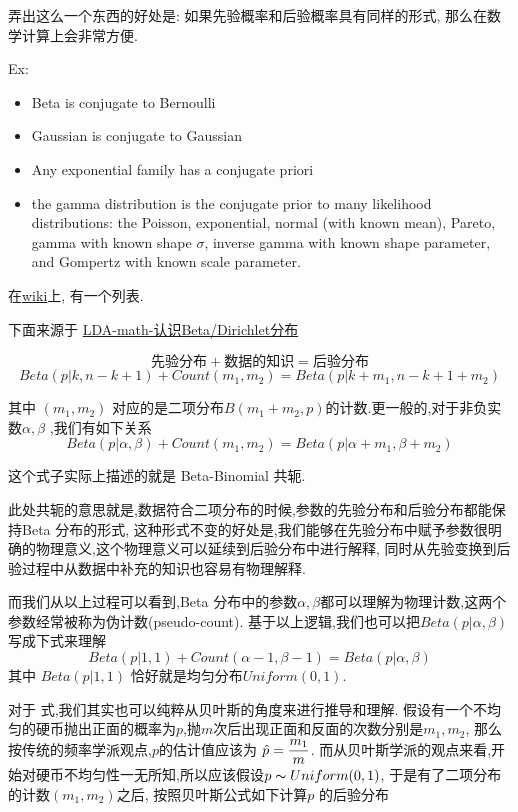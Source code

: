 \documentclass{article}
\begin{document}
弄出这么一个东西的好处是: 如果先验概率和后验概率具有同样的形式, 那么在数学计算上会非常方便.

Ex:
\begin{itemize}
\item Beta is conjugate to Bernoulli
\item Gaussian is conjugate to Gaussian
\item Any exponential family has a conjugate priori
\item the gamma distribution is the conjugate prior to many likelihood distributions: the Poisson, exponential, normal (with known mean), Pareto, gamma with known shape $\sigma$, inverse gamma with known shape parameter, and Gompertz with known scale parameter.
\end{itemize}

在\href{http://en.wikipedia.org/wiki/Conjugate\_prior\_distribution#Table\_of\_conjugate\_distributions}{wiki}上, 有一个列表.

下面来源于
\href{http://cos.name/2013/01/lda-math-beta-dirichlet/}{LDA-math-认识Beta/Dirichlet分布}

$$\text{先验分布} + \text{数据的知识} = \text{后验分布}$$
$$ Beta(p|k,n-k+1) + Count(m_1,m_2) = Beta(p|k+m_1,n-k+1+m_2) $$

其中 $(m_1,m_2)$ 对应的是二项分布$B(m_1+m_2,p)$的计数.更一般的,对于非负实数$\alpha,\beta$ ,我们有如下关系
$$ Beta(p|\alpha,\beta) + Count(m_1,m_2) = Beta(p|\alpha+m_1,\beta+m_2) $$

这个式子实际上描述的就是  Beta-Binomial 共轭.

此处共轭的意思就是,数据符合二项分布的时候,参数的先验分布和后验分布都能保持Beta 分布的形式,
这种形式不变的好处是,我们能够在先验分布中赋予参数很明确的物理意义,这个物理意义可以延续到后验分布中进行解释,
同时从先验变换到后验过程中从数据中补充的知识也容易有物理解释.

而我们从以上过程可以看到,Beta 分布中的参数$\alpha,\beta$都可以理解为物理计数,这两个参数经常被称为伪计数(pseudo-count).
基于以上逻辑,我们也可以把$Beta(p|\alpha,\beta)$写成下式来理解
\begin{equation}
Beta(p|1,1) + Count(\alpha-1,\beta-1) = Beta(p|\alpha,\beta)
\end{equation}
其中 $Beta(p|1,1)$ 恰好就是均匀分布$Uniform(0,1)$.

对于 \lasteq 式,我们其实也可以纯粹从贝叶斯的角度来进行推导和理解. 
假设有一个不均匀的硬币抛出正面的概率为$p$,抛$m$次后出现正面和反面的次数分别是$m_1,m_2$,
那么按传统的频率学派观点,$p$的估计值应该为 $\hat{p}=\dfrac{m_1}{m}$.
而从贝叶斯学派的观点来看,开始对硬币不均匀性一无所知,所以应该假设$p \thicksim{U}niform(0,1)$, 于是有了二项分布的计数$(m_1,m_2)$之后,
按照贝叶斯公式如下计算$p$ 的后验分布
\end{document}
